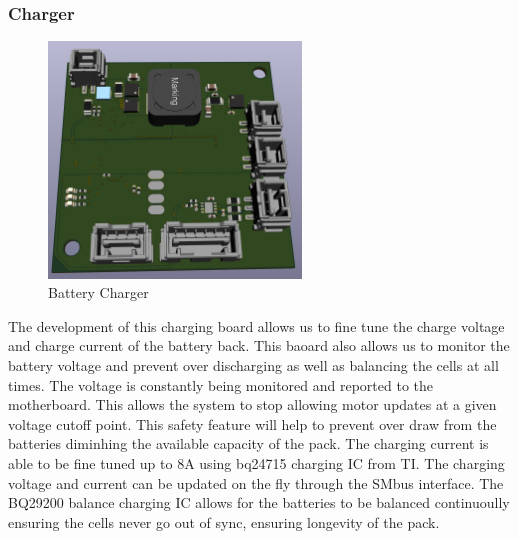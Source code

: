\subsubsection{Charger}
\begin{figure}[H]
       \centering
       \includegraphics[width=0.6\textwidth]{figures/Charger.png}
       \caption{Battery Charger}
       \label{fig:ChargerPCB}
   \end{figure}
The development of this charging board allows us to fine tune the charge voltage and charge current of the battery back. This baoard also allows us to monitor the battery voltage and prevent over discharging as well as balancing the cells at all times. The voltage is constantly being monitored and reported to the motherboard. This allows the system to stop allowing motor updates at a given voltage cutoff point. This safety feature will help to prevent over draw from the batteries diminhing the available capacity of the pack. The charging current is able to be fine tuned up to 8A using bq24715 charging IC from TI. The charging voltage and current can be updated on the fly through the SMbus interface. The BQ29200 balance charging IC allows for the batteries to be balanced continuoully ensuring the cells never go out of sync, ensuring longevity of the pack.

